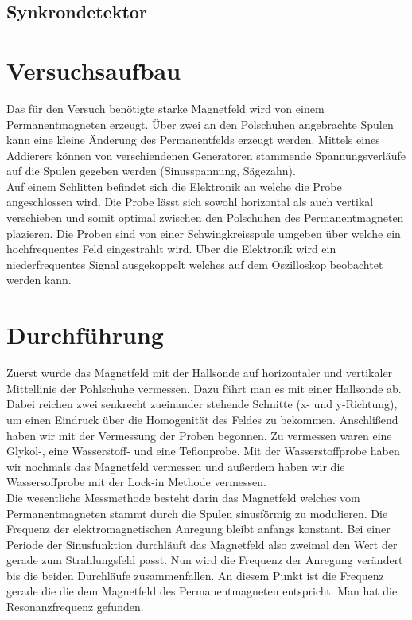 \documentclass[12pt]{article}
\begin{document}
\subsection{Synkrondetektor}


\section{Versuchsaufbau}
Das für den Versuch benötigte starke Magnetfeld wird von einem Permanentmagneten erzeugt. Über zwei an den Polschuhen angebrachte Spulen kann eine kleine Änderung des Permanentfelds erzeugt werden. Mittels eines Addierers können von verschiendenen Generatoren stammende Spannungsverläufe auf die Spulen gegeben werden (Sinusspannung, Sägezahn).\\

Auf einem Schlitten befindet sich die Elektronik an welche die Probe angeschlossen wird. Die Probe lässt sich sowohl horizontal als auch vertikal verschieben und somit optimal zwischen den Polschuhen des Permanentmagneten plazieren.
Die Proben sind von einer Schwingkreisspule umgeben über welche ein hochfrequentes Feld eingestrahlt wird. Über die Elektronik wird ein niederfrequentes Signal ausgekoppelt welches auf dem Oszilloskop beobachtet werden kann.

\section{Durchführung}

Zuerst wurde das Magnetfeld mit der Hallsonde auf horizontaler und vertikaler Mittellinie der Pohlschuhe vermessen.
Dazu fährt man es mit einer Hallsonde ab. Dabei reichen zwei senkrecht zueinander stehende Schnitte (x- und y-Richtung), um einen Eindruck über die Homogenität des Feldes zu bekommen.
 Anschlißend haben wir mit der Vermessung der Proben begonnen. Zu vermessen waren eine Glykol-, eine Wasserstoff- und eine Teflonprobe. Mit der Wasserstoffprobe haben wir nochmals das Magnetfeld vermessen und außerdem haben wir die Wassersoffprobe mit der Lock-in Methode vermessen.\\


Die wesentliche Messmethode besteht darin das Magnetfeld welches vom Permanentmagneten stammt durch die Spulen sinusförmig zu modulieren. Die Frequenz der elektromagnetischen Anregung bleibt anfangs konstant. Bei einer Periode der Sinusfunktion durchläuft das Magnetfeld also zweimal den Wert der gerade zum Strahlungsfeld passt. Nun wird die Frequenz der Anregung verändert bis die beiden Durchläufe zusammenfallen. An diesem Punkt ist die Frequenz gerade die die dem Magnetfeld des Permanentmagneten entspricht. Man hat die Resonanzfrequenz gefunden.
\end{document}
